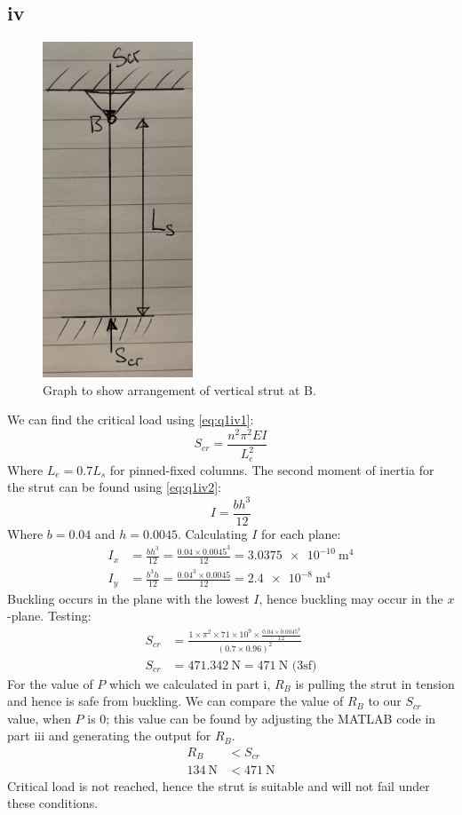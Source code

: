 \documentclass[11pt]{article}
\numberwithin{equation}{section}
\begin{document}
\subsection{iv}
\begin{figure}[H]
    \centering
    \includegraphics[height = 10cm]{./img/q1iv1.jpg}
    \caption{Graph to show arrangement of vertical strut at B.}
    \label{fig:q1iv}
\end{figure}
We can find the critical load using \ref{eq:q1iv1}:
\begin{equation}
    S_{cr} = \frac{n^2 \pi^2 EI}{L_e^2} \label{eq:q1iv1}
\end{equation}
Where $L_e = 0.7L_s$ for pinned-fixed columns. The second moment of inertia for the strut can be found using \ref{eq:q1iv2}:
\begin{equation}
    I = \frac{bh^3}{12} \label{eq:q1iv2}
\end{equation}
Where $b = 0.04$ and $h = 0.0045$. Calculating $I$ for each plane:
\begin{align}
    I_x &= \frac{bh^3}{12} = \frac{0.04\times 0.0045^3}{12} = \SI{3.0375e-10}{\meter\tothe{4}}\\
    I_y &= \frac{b^3h}{12} = \frac{0.04^3\times 0.0045}{12} = \SI{2.4e-8}{\meter\tothe{4}}
\end{align}
Buckling occurs in the plane with the lowest $I$, hence buckling may occur in the $x$-plane. Testing:
\begin{align}
    S_{cr} &= \frac{1\times \pi^2 \times 71\times 10^{9}\times \frac{0.04\times 0.0045^3}{12}}{(0.7\times0.96)^2}\\
    S_{cr} &= \SI{471.342}{\newton} = \SI{471}{\newton} \textrm{ (3sf)}
\end{align}
For the value of $P$ which we calculated in part i, $R_B$ is pulling the strut in tension and hence is safe from buckling. We can compare the value of $R_B$ to our $S_{cr}$ value, when $P$ is 0; this value can be found by adjusting the MATLAB code in part iii and generating the output for $R_B$.
\begin{align}
    R_B &< S_{cr}\\
    \SI{134}{\newton} &< \SI{471}{\newton}
\end{align}
Critical load is not reached, hence the strut is suitable and will not fail under these conditions. 
\end{document}
